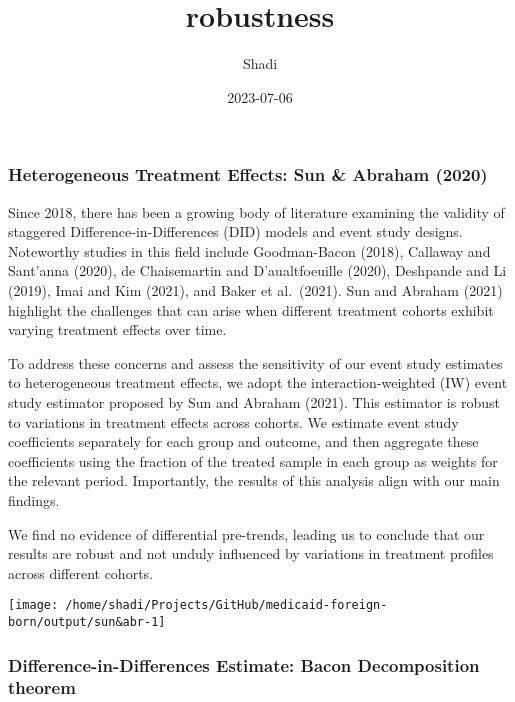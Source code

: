 \documentclass[
]{article}
\title{robustness}
\author{Shadi}
\date{2023-07-06}
\begin{document}
\maketitle

\hypertarget{heterogeneous-treatment-effects-sun-abraham-2020}{%
\subsubsection{Heterogeneous Treatment Effects: Sun \& Abraham
(2020)}\label{heterogeneous-treatment-effects-sun-abraham-2020}}

Since 2018, there has been a growing body of literature examining the
validity of staggered Difference-in-Differences (DID) models and event
study designs. Noteworthy studies in this field include Goodman-Bacon
(2018), Callaway and Sant'anna (2020), de Chaisemartin and
D'aualtfoeuille (2020), Deshpande and Li (2019), Imai and Kim (2021),
and Baker et al.~(2021). Sun and Abraham (2021) highlight the challenges
that can arise when different treatment cohorts exhibit varying
treatment effects over time.

To address these concerns and assess the sensitivity of our event study
estimates to heterogeneous treatment effects, we adopt the
interaction-weighted (IW) event study estimator proposed by Sun and
Abraham (2021). This estimator is robust to variations in treatment
effects across cohorts. We estimate event study coefficients separately
for each group and outcome, and then aggregate these coefficients using
the fraction of the treated sample in each group as weights for the
relevant period. Importantly, the results of this analysis align with
our main findings.

We find no evidence of differential pre-trends, leading us to conclude
that our results are robust and not unduly influenced by variations in
treatment profiles across different cohorts.

\begin{center}\texttt{[image: /home/shadi/Projects/GitHub/medicaid-foreign-born/output/sun\&abr-1]} \end{center}

\hypertarget{difference-in-differences-estimate-bacon-decomposition-theorem}{%
\subsubsection{Difference-in-Differences Estimate: Bacon Decomposition
theorem}\label{difference-in-differences-estimate-bacon-decomposition-theorem}}
\end{document}
